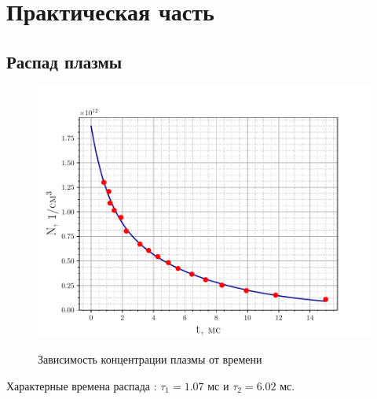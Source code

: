 \documentclass[10pt,pdf,hyperref={unicode}, dvipsnames]{beamer}
\begin{document}
\section{Практическая часть} %
\subsection{Распад  плазмы}
\begin{frame}

	\begin{figure}[tb]
		\centering
		\vspace{-20pt}
		\includegraphics[width=\linewidth]{fig/decay}
		\label{fig:2}
		\vspace{-20pt}
		\caption{Зависимость концентрации плазмы от времени}
		\vspace{-10pt}
	\end{figure}
	Характерные времена распада : $\tau_{1}=1.07$ мс и $\tau_{2}=6.02$ мс.
\end{frame}
\end{document}

